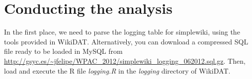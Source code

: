 \section{Conducting the analysis}
In the first place, we need to parse the logging table for simplewiki, using the
tools provided in WikiDAT. Alternatively, you can download a compressed SQL file
ready to be loaded in MySQL from \url{http://gsyc.es/~jfelipe/WPAC_2012/simplewiki_logging_062012.sql.gz}.
Then, load and execute the R file \textit{logging.R} in the \textit{logging}
directory of WikiDAT. 

% 

